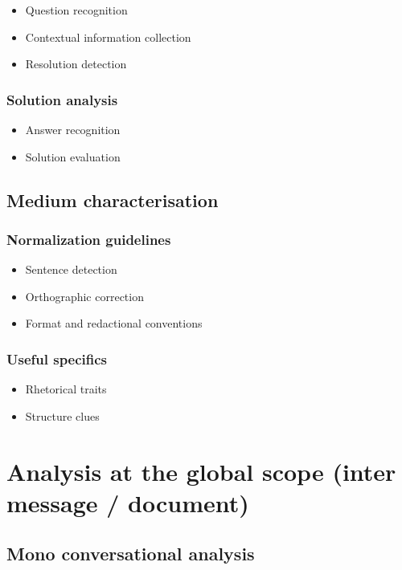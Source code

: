 \documentclass[11pt]{article}
\begin{document}
\begin{itemize}
	\item Question recognition
	\item Contextual information collection
	\item Resolution detection
\end{itemize}

\subsubsection{Solution analysis}

\begin{itemize}
	\item Answer recognition
	\item Solution evaluation
\end{itemize}

\subsection{Medium characterisation}

\subsubsection{Normalization guidelines}

\begin{itemize}
	\item Sentence detection
	\item Orthographic correction
	\item Format and redactional conventions
\end{itemize}

\subsubsection{Useful specifics}

\begin{itemize}
	\item Rhetorical traits
	\item Structure clues
\end{itemize}

\section{Analysis at the global scope (inter message / document)}

\subsection{Mono conversational analysis}
\end{document}
